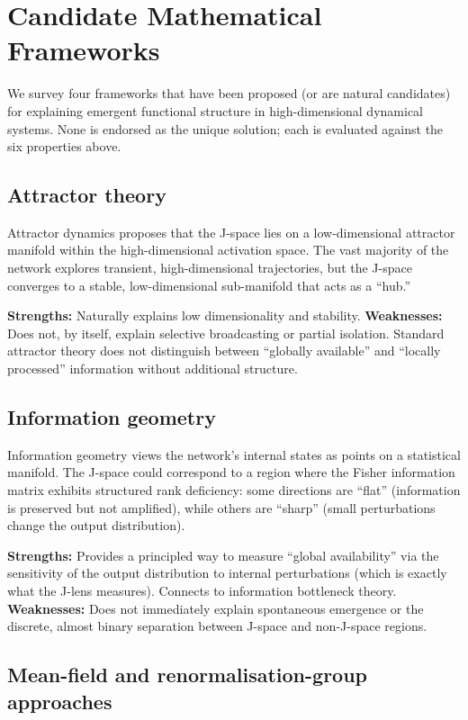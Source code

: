 \documentclass[11pt,a4paper]{article}
\theoremstyle{definition}
\begin{document}
\section{Candidate Mathematical Frameworks}
\label{sec:candidates}

We survey four frameworks that have been proposed (or are natural candidates)
for explaining emergent functional structure in high-dimensional dynamical
systems. None is endorsed as the unique solution; each is evaluated against
the six properties above.

\subsection{Attractor theory}

Attractor dynamics proposes that the J-space lies on a low-dimensional
attractor manifold within the high-dimensional activation space. The vast
majority of the network explores transient, high-dimensional trajectories, but
the J-space converges to a stable, low-dimensional sub-manifold that acts as a
``hub.''

\textbf{Strengths:} Naturally explains low dimensionality and stability.
\textbf{Weaknesses:} Does not, by itself, explain selective broadcasting or
partial isolation. Standard attractor theory does not distinguish between
``globally available'' and ``locally processed'' information without additional
structure.

\subsection{Information geometry}

Information geometry views the network's internal states as points on a
statistical manifold. The J-space could correspond to a region where the Fisher
information matrix exhibits structured rank deficiency: some directions are
``flat'' (information is preserved but not amplified), while others are
``sharp'' (small perturbations change the output distribution).

\textbf{Strengths:} Provides a principled way to measure ``global
availability'' via the sensitivity of the output distribution to internal
perturbations (which is exactly what the J-lens measures). Connects to
information bottleneck theory.
\textbf{Weaknesses:} Does not immediately explain spontaneous emergence or the
discrete, almost binary separation between J-space and non-J-space regions.

\subsection{Mean-field and renormalisation-group approaches}
\end{document}
